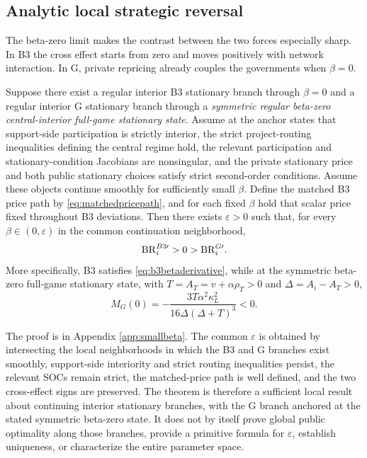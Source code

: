 \subsection{Analytic local strategic reversal}

The beta-zero limit makes the contrast between the two forces especially sharp. In B3 the cross effect starts from zero and moves positively with network interaction. In G, private repricing already couples the governments when $\beta=0$.

\begin{theorem}\label{thm:reversal}
Suppose there exist a regular interior B3 stationary branch through $\beta=0$ and a regular interior G stationary branch through a \emph{symmetric regular beta-zero central-interior full-game stationary state}. Assume at the anchor states that support-side participation is strictly interior, the strict project-routing inequalities defining the central regime hold, the relevant participation and stationary-condition Jacobians are nonsingular, and the private stationary price and both public stationary choices satisfy strict second-order conditions. Assume these objects continue smoothly for sufficiently small $\beta$. Define the matched B3 price path by \eqref{eq:matchedpricepath}, and for each fixed $\beta$ hold that scalar price fixed throughout B3 deviations. Then there exists $\varepsilon>0$ such that, for every $\beta\in(0,\varepsilon)$ in the common continuation neighborhood,
\[
\mathrm{BR}_i^{B3\prime}>0>\mathrm{BR}_i^{G\prime}.
\]
More specifically, B3 satisfies \eqref{eq:b3betaderivative}, while at the symmetric beta-zero full-game stationary state, with $T=A_T=v+\alpha\rho_T>0$ and $\Delta=A_i-A_T>0$,
\begin{equation}
M_G(0)
=
-\frac{3T\alpha^2\kappa_L^2}
{16\Delta(\Delta+T)^3}<0.
\label{eq:gzero}
\end{equation}
\end{theorem}

The proof is in Appendix \ref{app:smallbeta}. The common $\varepsilon$ is obtained by intersecting the local neighborhoods in which the B3 and G branches exist smoothly, support-side interiority and strict routing inequalities persist, the relevant SOCs remain strict, the matched-price path is well defined, and the two cross-effect signs are preserved. The theorem is therefore a sufficient local result about continuing interior stationary branches, with the G branch anchored at the stated symmetric beta-zero state. It does not by itself prove global public optimality along those branches, provide a primitive formula for $\varepsilon$, establish uniqueness, or characterize the entire parameter space.

